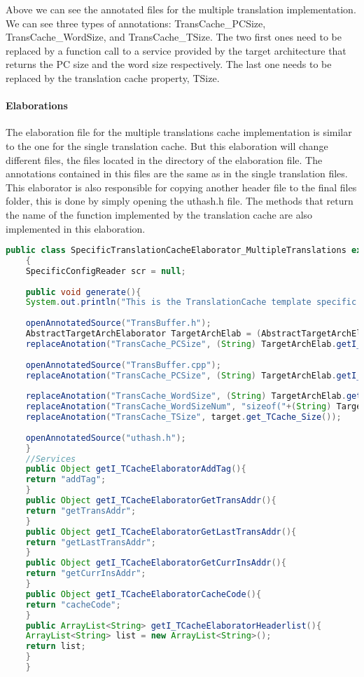 	Above we can see the annotated files for the multiple translation implementation. We can see three types of annotations: TransCache\_PCSize, TransCache\_WordSize, and TransCache\_TSize. The two first ones need to be replaced by a function call to a service provided by the target architecture that returns the PC size and the word size respectively. The last one needs to be replaced by the translation cache property, TSize.
	
	
	
	\paragraph{Elaborations}
	The elaboration file for the multiple translations cache implementation is similar to the one for the single translation cache. But this elaboration will change different files, the files located in the directory of the elaboration file. The annotations contained in this files are the same as in the single translation files. This elaborator is also responsible for copying another header file to the final files folder, this is done by simply opening the uthash.h file. The methods that return the name of the function implemented by the translation cache are also implemented in this elaboration.
	
	\begin{lstlisting}[caption={Multiple Translation Cache Elaboration}, label={lst:MTCacheElab},language=java]
	public class SpecificTranslationCacheElaborator_MultipleTranslations extends AbstractTranslationCacheElaborator 
	{
	SpecificConfigReader scr = null;
	
	public void generate(){
	System.out.println("This is the TranslationCache template specific elaboration.");
	
	openAnnotatedSource("TransBuffer.h");		
	AbstractTargetArchElaborator TargetArchElab = (AbstractTargetArchElaborator) getElaborator((_TargetArch) target.get_r_ISA());
	replaceAnotation("TransCache_PCSize", (String) TargetArchElab.getI_ISAElaboratorPCSize());
	
	openAnnotatedSource("TransBuffer.cpp");		
	replaceAnotation("TransCache_PCSize", (String) TargetArchElab.getI_ISAElaboratorPCSize());
	
	replaceAnotation("TransCache_WordSize", (String) TargetArchElab.getI_ISAElaboratorGetWordSize());
	replaceAnotation("TransCache_WordSizeNum", "sizeof("+(String) TargetArchElab.getI_ISAElaboratorGetWordSize()+")");
	replaceAnotation("TransCache_TSize", target.get_TCache_Size());		
	
	openAnnotatedSource("uthash.h");
	}
	//Services
	public Object getI_TCacheElaboratorAddTag(){
	return "addTag";
	}
	public Object getI_TCacheElaboratorGetTransAddr(){
	return "getTransAddr";
	}
	public Object getI_TCacheElaboratorGetLastTransAddr(){
	return "getLastTransAddr";
	}
	public Object getI_TCacheElaboratorGetCurrInsAddr(){
	return "getCurrInsAddr";
	}
	public Object getI_TCacheElaboratorCacheCode(){
	return "cacheCode";
	}
	public ArrayList<String> getI_TCacheElaboratorHeaderlist(){
	ArrayList<String> list = new ArrayList<String>();
	return list;
	}
	}
	\end{lstlisting}

